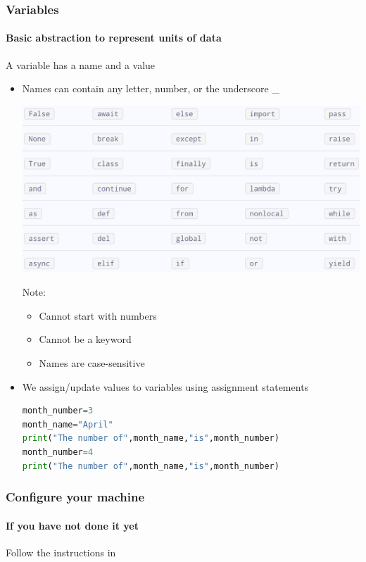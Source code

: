 \documentclass{beamer}%
\begin{document}
\begin{frame}[fragile]
	\frametitle{{Variables}}
	\framesubtitle{Basic abstraction to represent units of data}
	A variable has a name and a value
	\begin{itemize}
		\item Names can contain any letter, number, or the underscore \_
		\\
		\begin{minipage}{0.50\textwidth}
			\includegraphics[width=1.0\textwidth]{figures/keywords}
		\end{minipage}
		\begin{minipage}{0.42\textwidth}
			Note:
			\begin{itemize}
				\item Cannot start with numbers
				\item Cannot be a  keyword
				\item Names are case-sensitive
			\end{itemize}
		\end{minipage}
		
		\item We assign/update values to variables using assignment statements
		
\begin{lstlisting}[language=python]
month_number=3
month_name="April"
print("The number of",month_name,"is",month_number)
month_number=4
print("The number of",month_name,"is",month_number)
\end{lstlisting}
\end{itemize}
\end{frame}



\begin{frame}
	\frametitle{Configure your machine}
	\framesubtitle{If you have not done it yet}
	\centering
	Follow the instructions in\\
	\myurl{\homepagesetup}
\end{frame}


\end{document}
